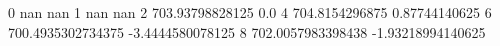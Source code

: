 0 nan nan
1 nan nan
2 703.93798828125 0.0
4 704.8154296875 0.87744140625
6 700.4935302734375 -3.4444580078125
8 702.0057983398438 -1.93218994140625
